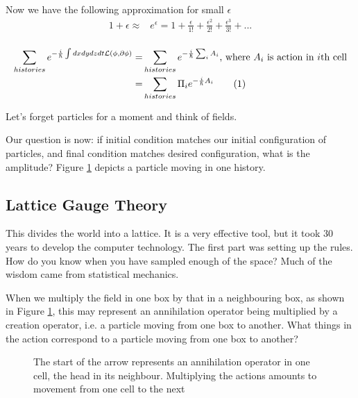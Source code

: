 \documentclass[]{article}
\newcommand\numberthis{\addtocounter{equation}{1}\tag{\theequation}}
\begin{document}
Now we have the following approximation for small $\epsilon$
\begin{align*}
	1 + \epsilon \approx &e^\epsilon= 1 + \frac{\epsilon}{1!} + \frac{\epsilon^2}{2!}  + \frac{\epsilon^3}{3!} +...\\
\end{align*}

\begin{align*}
	\sum_{histories} e^{-\frac{i}{\hslash} \int dx dy dz dt\mathcal{L}(\phi,\partial \phi) } =& \sum_{histories} e^{-\frac{i}{\hslash} \sum_i A_i } \text{, where $A_i$ is action in $i$th cell}\\
	=& \sum_{histories} \Pi_i e^{-\frac{i}{\hslash} A_i } \numberthis \label{eq:sum:actions}
\end{align*}

Let's forget particles for a moment and think of fields.

Our question is now: if initial condition matches our initial configuration of particles, and final condition matches desired configuration, what is the amplitude? Figure \ref{fig:path-integral3} depicts a particle moving in one history.

\subsection{Lattice Gauge Theory}

This divides the world into a lattice. It is a very effective tool, but it took 30 years to develop the computer technology. The first part was setting up the rules. How do you know when you have sampled enough of the space? Much of the wisdom came from statistical mechanics.

When we multiply the field in one box by that in a neighbouring box, as shown in Figure \ref{fig:path-integral3}, this may represent an annihilation operator being multiplied by a creation operator, i.e. a particle moving from one box to another. What things in the action correspond to a particle moving from one box to another?

\begin{figure}[H]
	\begin{center}
		\caption[Particle moving from one box to another]{The start of the arrow represents an annihilation operator in one cell, the head in its neighbour. Multiplying the actions amounts to movement from one cell to the next}\label{fig:path-integral3}
	\end{center}
\end{figure}
 
\end{document}
